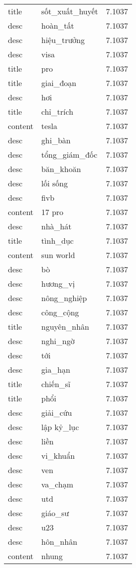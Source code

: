 \documentclass{article}
\begin{document}
\begin{tabular}{lll}
title & sốt\_xuất\_huyết & 7.1037\\
desc & hoàn\_tất & 7.1037\\
desc & hiệu\_trưởng & 7.1037\\
desc & visa & 7.1037\\
title & pro & 7.1037\\
title & giai\_đoạn & 7.1037\\
desc & hơi & 7.1037\\
title & chỉ\_trích & 7.1037\\
content & tesla & 7.1037\\
desc & ghi\_bàn & 7.1037\\
desc & tổng\_giám\_đốc & 7.1037\\
desc & băn\_khoăn & 7.1037\\
desc & lối sống & 7.1037\\
desc & fivb & 7.1037\\
content & 17 pro & 7.1037\\
desc & nhà\_hát & 7.1037\\
title & tình\_dục & 7.1037\\
content & sun world & 7.1037\\
desc & bò & 7.1037\\
desc & hương\_vị & 7.1037\\
desc & nông\_nghiệp & 7.1037\\
desc & công\_cộng & 7.1037\\
title & nguyên\_nhân & 7.1037\\
desc & nghi\_ngờ & 7.1037\\
desc & tới & 7.1037\\
desc & gia\_hạn & 7.1037\\
title & chiến\_sĩ & 7.1037\\
title & phổi & 7.1037\\
desc & giải\_cứu & 7.1037\\
desc & lập kỷ\_lục & 7.1037\\
desc & liền & 7.1037\\
desc & vi\_khuẩn & 7.1037\\
desc & ven & 7.1037\\
desc & va\_chạm & 7.1037\\
desc & utd & 7.1037\\
desc & giáo\_sư & 7.1037\\
desc & u23 & 7.1037\\
desc & hôn\_nhân & 7.1037\\
content & nhung & 7.1037\\

\end{tabular}
\end{document}
